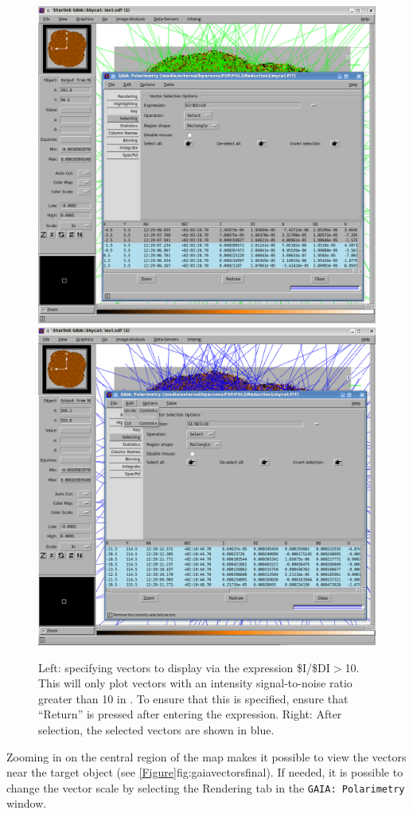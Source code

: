 \begin{figure}[t!]
\begin{center}
\includegraphics[width=0.46\linewidth]{sc22-gaia-plot-vectors-4.png}
\includegraphics[width=0.46\linewidth]{sc22-gaia-plot-vectors-6.png}
\caption [Selecting Vectors in GAIA]{Left: specifying vectors
  to display via the expression \$I/\$DI$>$10. This will only plot
  vectors with an intensity signal-to-noise
  ratio greater than 10 in \GAIA. To ensure that this is specified,
  ensure that ``Return'' is pressed after entering the expression.
  Right: After selection, the selected vectors are shown in blue.
}
\label{fig:gaiavectorssecond}
\end{center}
\end{figure}

Zooming in on the central region of the map makes it possible to view
the vectors near the target object (see \cref{Figure}{fig:gaiavectorsfinal}{}).
If needed, it is possible to change the vector scale by selecting the Rendering
tab in the \texttt{GAIA: Polarimetry} window.


